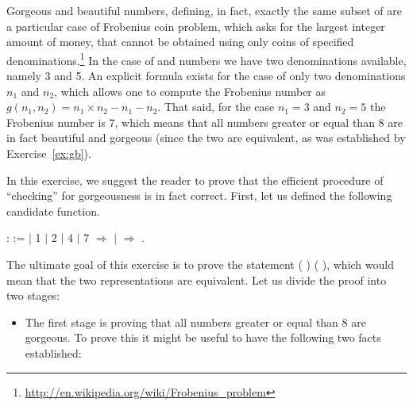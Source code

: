 \begin{exercise}




Gorgeous and beautiful numbers, defining, in fact, exactly the same
subset of  are a particular case of Frobenius coin problem, which
asks for the largest integer amount of money, that cannot be obtained
using only coins of specified
denominations.\footnote{\url{http://en.wikipedia.org/wiki/Frobenius_problem}}
In the case of  and  numbers we have two
denominations available, namely 3 and 5. An explicit formula
exists for the case of only two denominations $n_1$ and $n_2$, which
allows one to compute the Frobenius number as $g(n_1, n_2) = n_1
\times n_2 - n_1 - n_2$. That said, for the case $n_1 = 3$ and $n_2 =
5$ the Frobenius number is $7$, which means that all numbers greater
or equal than $8$ are in fact beautiful and gorgeous (since the two
are equivalent, as was established by Exercise~\ref{ex:gb}).


In this exercise, we suggest the reader to prove that the efficient
procedure of ``checking'' for gorgeousness is in fact correct. First,
let us defined the following candidate function.


\begin{coqdoccode}
\coqdocemptyline
\coqdocnoindent
{}   :  :=    \coqdoceol
\coqdocindent{0.50em}
\ensuremath{|} 1 \ensuremath{|} 2 \ensuremath{|} 4 \ensuremath{|} 7 \ensuremath{\Rightarrow} \coqdoceol
\coqdocindent{0.50em}
\ensuremath{|} \coqdocvar{\_} \ensuremath{\Rightarrow} \coqdoceol
\coqdocindent{0.50em}
.\coqdoceol
\coqdocemptyline
\end{coqdoccode}


\noindent
The ultimate goal of this exercise is to prove the statement 
( ) ( ), which would mean that the two
representations are equivalent. Let us divide the proof into two stages:



\begin{itemize}
\item  The first stage is proving that all numbers greater or equal than
  8 are gorgeous. To prove this it might be useful to have the
  following two facts established:


\end{itemize}
\end{exercise}
